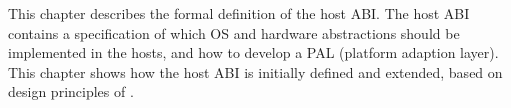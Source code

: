 This chapter describes the formal definition of the host ABI.
The host ABI contains a specification of which OS and hardware abstractions should be implemented in the hosts, %
and how to develop
a PAL (platform adaption layer).
This chapter shows how the host ABI is initially defined and extended,
based on design principles of \graphene{}. %


















%
%
%











